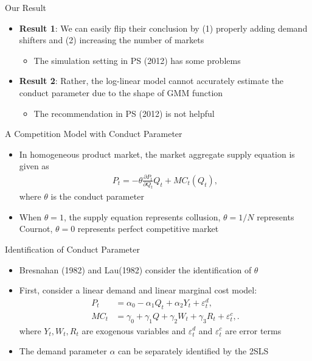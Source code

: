 \documentclass[aspectratio = 169]{beamer}
\theoremstyle{definition}
\begin{document}
\begin{frame}{Our Result}
    \begin{itemize}
        \item \textbf{Result 1}: We can easily flip their conclusion by (1) properly adding demand shifters and (2) increasing the number of markets
        \begin{itemize}
            \item The simulation setting in PS (2012) has some problems
        \end{itemize}
        \item \textbf{Result 2}: Rather, the log-linear model cannot accurately estimate the conduct parameter due to the shape of GMM function
        \begin{itemize}
            \item The recommendation in PS (2012) is not helpful
        \end{itemize}
    \end{itemize}
\end{frame}


\begin{frame}{A Competition Model with Conduct Parameter}
    \begin{itemize}
        \item In homogeneous product market, the market aggregate supply equation is given as
        \begin{align*}
            P_t = -\theta\frac{\partial P_t}{\partial Q_t}Q_t + MC_t(Q_t),
        \end{align*}
        where $\theta$ is the conduct parameter
        \item When $\theta = 1$, the supply equation represents collusion, $\theta = 1/N$ represents Cournot, $\theta =0$ represents perfect competitive market
    \end{itemize}
\end{frame}




\begin{frame}{Identification of Conduct Parameter}
    \begin{itemize}
        \item Bresnahan (1982) and Lau(1982) consider the identification of $\theta$
        \item First, consider a linear demand and linear marginal cost model:
        \begin{align}
            P_t &= \alpha_0 - \alpha_1 Q_t + \alpha_2 Y_t + \varepsilon^{d}_{t},\label{eq:linear_demand}\\
            MC_t &= \gamma_0  + \gamma_1 Q + \gamma_2 W_{t} + \gamma_3 R_t + \varepsilon^{c}_{t},\label{eq:linear_marginal_cost}.
        \end{align}
        where $Y_t, W_t, R_t$ are exogenous variables and $\varepsilon^{d}_{t}$ and $\varepsilon^{c}_{t}$ are error terms
        \item The demand parameter $\alpha$ can be separately identified by the 2SLS
    \end{itemize}
\end{frame}
\end{document}
